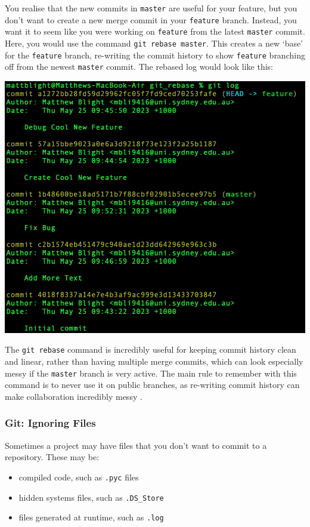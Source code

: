 \documentclass[a4paper, 11pt]{report}
\begin{document}
You realise that the new commits in \verb|master| are useful for your feature, but you don’t want to create a new merge commit in your \verb|feature| branch. Instead, you want it to seem like you were working on \verb|feature| from the latest \verb|master| commit. Here, you would use the command \verb|git rebase master|. This creates a new ‘base’ for the \verb|feature| branch, re-writing the commit history to show \verb|feature| branching off from the newest \verb|master| commit. The rebased log would look like this:

\includegraphics[width=\textwidth]{rebase3}

The \verb|git rebase| command is incredibly useful for keeping commit history clean and linear, rather than having multiple merge commits, which can look especially messy if the \verb|master| branch is very active. The main rule to remember with this command is to never use it on public branches, as re-writing commit history can make collaboration incredibly messy \cite{rebase}.

\subsubsection{Git: Ignoring Files \cite{ignore}}

Sometimes a project may have files that you don’t want to commit to a repository. These may be:

\begin{itemize}
	\item compiled code, such as \verb|.pyc| files
	\item hidden systems files, such as \verb|.DS_Store|
	\item files generated at runtime, such as \verb|.log|
\end{itemize}
\end{document}
